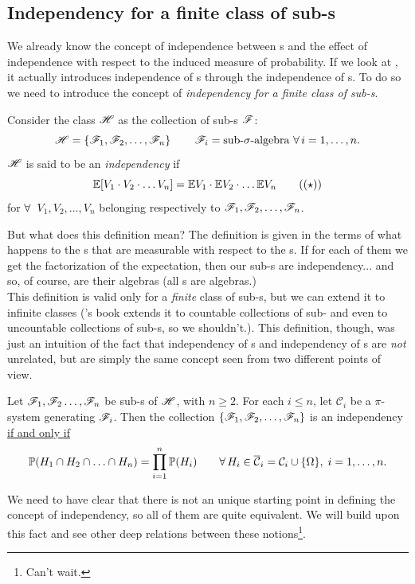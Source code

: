\documentclass{report}
\begin{document}
\subsection{Independency for a finite class of sub-\sa s}
We already know the concept of independence between \rv s and the effect of independence with respect to the induced measure of probability. If we look at \cinlar, it actually introduces independence of \rv{}s through the independence of \sa s. To do so we need to introduce the concept of \emph{independency for a finite class of sub-\sa s}.
\begin{definition}
	Consider the class $\mathscr{H}$ as the collection of sub-\sa s $\mathscr{F}$:
\[\mathscr{H}=\left\{\mathscr{F}_1,\mathscr{F}_2,\ldots,\mathscr{F}_n\right\}\qquad\mathscr{F}_i=\text{sub-$\sigma$-algebra }\forall\, i=1,\ldots,n.\]
$\mathscr{H}$ is said to be an \emph{independency} if
\begin{equation}
	\mathbb{E}[V_1\cdot V_2\cdot\ldots V_n]=\mathbb{E} V_1\cdot\mathbb{E} V_2\cdot\ldots\mathbb{E} V_n\tag{($\star$)}\label{independency}
\end{equation}
for $\forall\,$ \rv{} $V_1,V_2,\ldots,V_n$ belonging respectively to $\mathscr{F}_1,\mathscr{F}_2,\ldots,\mathscr{F}_n$.
\end{definition}
But what does this definition mean? The definition is given in the terms of what happens to the \rv s that are measurable with respect to the \sa s. If for each of them we get the factorization of the expectation, then our sub-\sa s are independency... and so, of course, are their algebras (all \sa s are algebras.)\\
This definition is valid only for a \textit{finite} class of sub-\sa s, but we can extend it to infinite classes (\cinlar's book extends it to countable collections of sub- and even to uncountable collections of sub-\sa s, so we shouldn't.). This definition, though, was just an intuition of the fact that independency of \sa s and independency of \rv s are \textit{not} unrelated, but are simply the same concept seen from two different points of view. 
\begin{proposition}
	Let $\mathscr{F}_1,\mathscr{F}_2\ldots,\mathscr{F}_n$ be sub-\sa s of $\mathscr{H}$, with $n\geq 2$. For each $i\leq n$, let $\mathcal{C}_i$ be a $\pi$-system generating $\mathscr{F}_i$. Then the collection $\left\{\mathscr{F}_1,\mathscr{F}_2,\ldots,\mathscr{F}_n\right\}$ is an independency \underline{if and only if}
	\[\mathbb{P}(H_1\cap H_2\cap \ldots\cap H_n)=\prod_{i=1}^{n}\mathbb{P}(H_i)\qquad\forall\, H_i\in\overline{\mathcal{C}}_i=\mathcal{C}_i\cup\{\Omega\},\;i=1,\ldots,n.\]
\end{proposition}
We need to have clear that there is not an unique starting point in defining the concept of independency, so all of them are quite equivalent. We will build upon this fact and see other deep relations between these notions\footnote{Can't wait.}.
\end{document}

